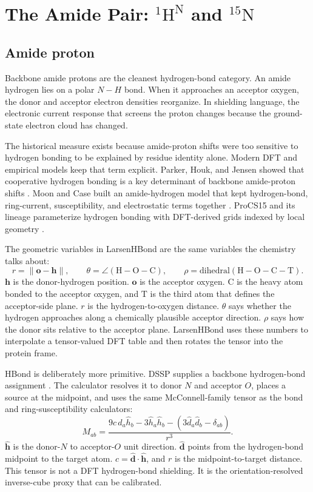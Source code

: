 \documentclass[11pt]{article}
\begin{document}
\section{\texorpdfstring{The Amide Pair: \(^{1}\mathrm H^\mathrm N\)
and \(^{15}\mathrm N\)}{The Amide Pair: 1HN and 15N}}

\subsection{Amide proton}

Backbone amide protons are the cleanest hydrogen-bond category. An amide
hydrogen lies on a polar \(N-H\) bond. When it approaches an acceptor oxygen,
the donor and acceptor electron densities reorganize. In shielding language,
the electronic current response that screens the proton changes because the
ground-state electron cloud has changed.

The historical measure exists because amide-proton shifts were too sensitive to
hydrogen bonding to be explained by residue identity alone. Modern DFT and
empirical models keep that term explicit. Parker, Houk, and Jensen showed that
cooperative hydrogen bonding is a key determinant of backbone amide-proton
shifts \cite{parker2006}. Moon and Case built an amide-hydrogen model that
kept hydrogen-bond, ring-current, susceptibility, and electrostatic terms
together \cite{mooncase2007}. ProCS15 and its lineage parameterize hydrogen
bonding with DFT-derived grids indexed by local geometry \cite{larsen2015}.

The geometric variables in LarsenHBond are the same variables the chemistry
talks about:
\[
  r=\|\bm o-\bm h\|,
  \qquad
  \theta=\angle(\mathrm H-\mathrm O-\mathrm C),
  \qquad
  \rho=\mathrm{dihedral}(\mathrm H-\mathrm O-\mathrm C-\mathrm T).
\]
\(\bm h\) is the donor-hydrogen position. \(\bm o\) is the acceptor oxygen.
\(\mathrm C\) is the heavy atom bonded to the acceptor oxygen, and
\(\mathrm T\) is the third atom that defines the acceptor-side plane. \(r\) is
the hydrogen-to-oxygen distance. \(\theta\) says whether the hydrogen approaches
along a chemically plausible acceptor direction. \(\rho\) says how the donor
sits relative to the acceptor plane. LarsenHBond uses these numbers to
interpolate a tensor-valued DFT table and then rotates the tensor into the
protein frame.

HBond is deliberately more primitive. DSSP supplies a backbone hydrogen-bond
assignment \cite{kabsch1983}. The calculator resolves it to donor \(N\) and
acceptor \(O\), places a source at the midpoint, and uses the same
McConnell-family tensor as the bond and ring-susceptibility calculators:
\[
  M_{ab}
  =
  \frac{
    9c\,\hat d_a\hat h_b
    -3\hat h_a\hat h_b
    -\left(3\hat d_a\hat d_b-\delta_{ab}\right)}
  {r^3}.
\]
\(\hat{\bm h}\) is the donor-\(N\) to acceptor-\(O\) unit direction.
\(\hat{\bm d}\) points from the hydrogen-bond midpoint to the target atom.
\(c=\hat{\bm d}\cdot\hat{\bm h}\), and \(r\) is the midpoint-to-target
distance. This tensor is not a DFT hydrogen-bond shielding. It is the
orientation-resolved inverse-cube proxy that can be calibrated.
\end{document}
